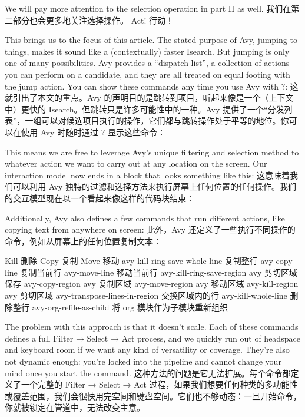 \documentclass[lang=cn,color=blue]{elegantbook}
\begin{document}
We will pay more attention to the selection operation in part II as well.
我们在第二部分也会更多地关注选择操作。
Act!  行动！

This brings us to the focus of this article. The stated purpose of Avy, jumping to things, makes it sound like a (contextually) faster Isearch. But jumping is only one of many possibilities. Avy provides a “dispatch list”, a collection of actions you can perform on a candidate, and they are all treated on equal footing with the jump action. You can show these commands any time you use Avy with ?:
这就引出了本文的重点。Avy 的声明目的是跳转到项目，听起来像是一个（上下文中）更快的 Isearch。但跳转只是许多可能性中的一种。Avy 提供了一个“分发列表”，一组可以对候选项目执行的操作，它们都与跳转操作处于平等的地位。你可以在使用 Avy 时随时通过 ? 显示这些命令：

This means we are free to leverage Avy’s unique filtering and selection method to whatever action we want to carry out at any location on the screen. Our interaction model now ends in a block that looks something like this:
这意味着我们可以利用 Avy 独特的过滤和选择方法来执行屏幕上任何位置的任何操作。我们的交互模型现在以一个看起来像这样的代码块结束：

Additionally, Avy also defines a few commands that run different actions, like copying text from anywhere on screen:
此外，Avy 还定义了一些执行不同操作的命令，例如从屏幕上的任何位置复制文本：

Kill  删除 	Copy  复制 	Move  移动
avy-kill-ring-save-whole-line
复制整行 	avy-copy-line  复制当前行 	avy-move-line  移动当前行
avy-kill-ring-save-region
avy 剪切区域保存 	avy-copy-region  avy 复制区域 	avy-move-region  avy 移动区域
avy-kill-region  avy 剪切区域 		avy-transpose-lines-in-region
交换区域内的行
avy-kill-whole-line  删除整行 		avy-org-refile-as-child  将 org 模块作为子模块重新组织

The problem with this approach is that it doesn’t scale. Each of these commands defines a full Filter → Select → Act process, and we quickly run out of headspace and keyboard room if we want any kind of versatility or coverage. They’re also not dynamic enough: you’re locked into the pipeline and cannot change your mind once you start the command.
这种方法的问题是它无法扩展。每个命令都定义了一个完整的 Filter → Select → Act 过程，如果我们想要任何种类的多功能性或覆盖范围，我们会很快用完空间和键盘空间。它们也不够动态：一旦开始命令，你就被锁定在管道中，无法改变主意。
\end{document}

